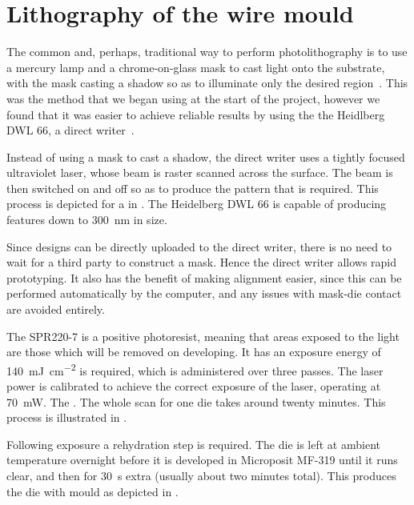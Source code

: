 \section{Lithography of the wire mould}

The common and, perhaps, traditional way to perform photolithography is to use
a mercury lamp and a chrome-on-glass mask to cast light onto the
substrate, with the mask casting a shadow so as to illuminate only the desired
region~\cite{Madou2002}. This was the method that we began using at the start of the
project, however we found that it was easier to achieve reliable results by
using the the Heidlberg DWL 66, a direct writer~\cite{}. 

Instead of using a mask to cast a shadow, the direct writer uses a tightly
focused ultraviolet laser, whose beam is raster scanned across the surface. The
beam is then switched on and off so as to produce the pattern that is required.
This process is depicted for a in . The Heidelberg
DWL 66 is capable of producing features down to \SI{300}{\nano\meter} in size.

Since designs can be directly uploaded to the direct writer, there is no need
to wait for a third party to construct a mask.  Hence the direct writer allows
rapid prototyping. It also has the benefit of making alignment easier, since
this can be performed automatically by the computer, and any issues with
mask-die contact are avoided entirely. 

The SPR220-7 is a positive photoresist, meaning that areas exposed to the light
are those which will be removed on developing. It has an exposure energy of
\SI{140}{\milli\joule\per\square\centi\meter} is required, which is
administered over three passes. The laser power is calibrated to achieve the
correct exposure of the laser, operating at \SI{70}{\milli\watt}.  The . The
whole scan for one die takes around twenty minutes. This process is illustrated
in .

Following exposure a rehydration step is required. The die is left at ambient
temperature overnight before it is developed in Microposit MF-319 until it runs
clear, and then for \SI{30}{\second} extra (usually about two minutes total).
This produces the die with mould as depicted in .

